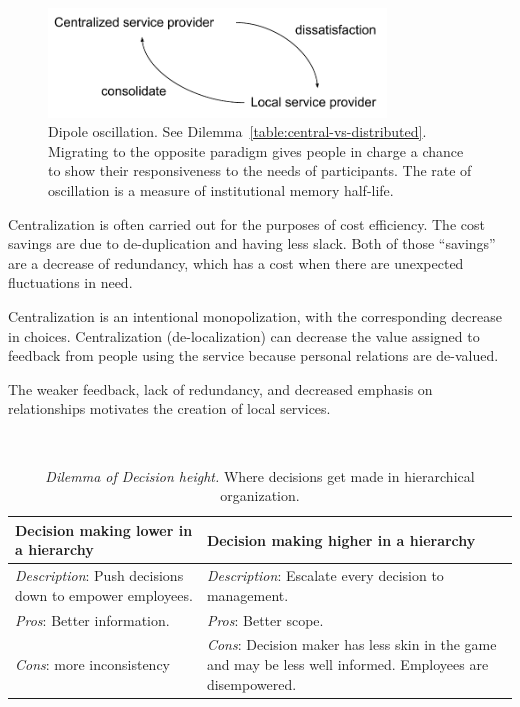 \begin{figure}[H] %
    \centering
    \includegraphics[width=0.8\textwidth]{images/dilemma_centralization-vs-distributed.pdf}
    \caption{Dipole oscillation. See Dilemma~\ref{table:central-vs-distributed}. Migrating to the opposite paradigm gives people in charge a chance to show their responsiveness to the needs of participants. The rate of oscillation is a measure of institutional memory half-life.}
    \label{fig:central-vs-distributed}
\end{figure}

Centralization is often carried out for the purposes of cost efficiency. The cost savings are due to de-duplication and having less slack. Both of those ``savings'' are a decrease of redundancy, which has a cost when there are unexpected fluctuations in need. 

Centralization is an intentional monopolization, with the corresponding decrease in choices. 
Centralization (de-localization) can decrease the value assigned to feedback from people using the service because personal relations are de-valued. 

The weaker feedback, lack of redundancy, and decreased emphasis on relationships motivates the creation of local services. 

\ \\

\begin{center}
\begin{table}[H] %
\begin{tabular}{ | m{\dilemmatablewidth}| m{\dilemmatablewidth} | } 
  \hline
  \textbf{Decision making lower in a hierarchy} &
  \textbf{Decision making higher in a hierarchy} \\
  \hline
  \textit{Description}: Push decisions down to empower employees. &
  \textit{Description}: Escalate every decision to management. \\  
  \hline
  \textit{Pros}: Better information. &
  \textit{Pros}: Better scope. \\
  \hline
  \textit{Cons}: more inconsistency & 
  \textit{Cons}: Decision maker has less skin in the game and may be less well informed. Employees are disempowered. \\
  \hline
\end{tabular}
\caption{\textit{Dilemma of Decision height.}
Where decisions get made in hierarchical organization.
}
\label{table:decisions_low-vs-high}
\end{table}
\end{center}


